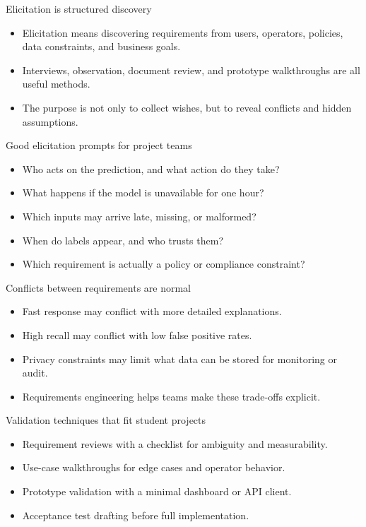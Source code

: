 \begin{frame}{Elicitation is structured discovery}
\begin{itemize}
\item Elicitation means discovering requirements from users, operators, policies, data constraints, and business goals.
\item Interviews, observation, document review, and prototype walkthroughs are all useful methods.
\item The purpose is not only to collect wishes, but to reveal conflicts and hidden assumptions.
\end{itemize}
\coursefooter
\end{frame}

\begin{frame}{Good elicitation prompts for project teams}
\begin{itemize}
\item Who acts on the prediction, and what action do they take?
\item What happens if the model is unavailable for one hour?
\item Which inputs may arrive late, missing, or malformed?
\item When do labels appear, and who trusts them?
\item Which requirement is actually a policy or compliance constraint?
\end{itemize}
\coursefooter
\end{frame}

\begin{frame}{Conflicts between requirements are normal}
\begin{itemize}
\item Fast response may conflict with more detailed explanations.
\item High recall may conflict with low false positive rates.
\item Privacy constraints may limit what data can be stored for monitoring or audit.
\item Requirements engineering helps teams make these trade-offs explicit.
\end{itemize}
\coursefooter
\end{frame}

\begin{frame}{Validation techniques that fit student projects}
\begin{itemize}
\item Requirement reviews with a checklist for ambiguity and measurability.
\item Use-case walkthroughs for edge cases and operator behavior.
\item Prototype validation with a minimal dashboard or API client.
\item Acceptance test drafting before full implementation.
\end{itemize}
\coursefooter
\end{frame}

